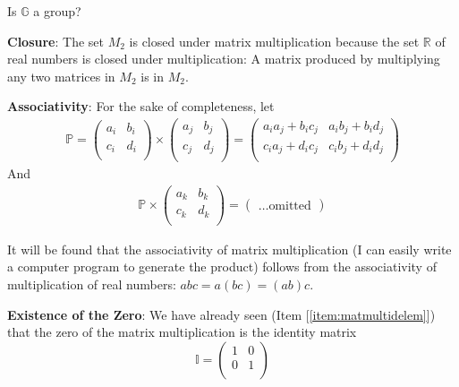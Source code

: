 \documentclass[english,notitlepage,smartquotes]{hgbreport}
\theoremstyle{definition}
\theoremstyle{definition}
\theoremstyle{remark}
\theoremstyle{definition}
\theoremstyle{plain}
\theoremstyle{definition}
\begin{document}
\begin{enumerate}
Is $\mathbb{G}$ a group?

\textbf{Closure}: The set $M_2$ is closed under matrix multiplication because the set $\mathbb{R}$ of real numbers is closed under multiplication: A matrix produced by multiplying any two matrices in $M_2$ is in $M_2$. 

\textbf{Associativity}: For the sake of completeness, let
\begin{equation}
\begin{aligned}
  \mathbb{P}=\begin{pmatrix}
    a_i & b_i\\
    c_i & d_i\\
  \end{pmatrix}
  \times
  \begin{pmatrix}
    a_j & b_j\\
    c_j & d_j\\
  \end{pmatrix}
  =
  \begin{pmatrix}
    a_ia_j+b_ic_j & a_ib_j+b_id_j \\
    c_ia_j+d_ic_j & c_ib_j+d_id_j\\
  \end{pmatrix}
\end{aligned}\label{eq:exmaxmult}
\end{equation}
And
\begin{equation}
\begin{aligned}
  \mathbb{P}\times\begin{pmatrix}
    a_k & b_k\\
    c_k & d_k\\
  \end{pmatrix}
  =
  \begin{pmatrix}
  \dots \text{omitted}
  \end{pmatrix}
\end{aligned}\label{eq:assocp}
\end{equation}

It will be found that the associativity of matrix multiplication (I can easily write a computer program to generate the product) follows from the associativity of multiplication of real numbers: $abc=a(bc)=(ab)c$.

\textbf{Existence of the Zero}: We have already seen (Item [\ref{item:matmultidelem}]) that the zero of the matrix multiplication is the identity matrix 
$$
  \mathbb{I}=\begin{pmatrix}
    1 & 0\\
    0 & 1\\
  \end{pmatrix}
$$


\end{enumerate}
\end{document}
